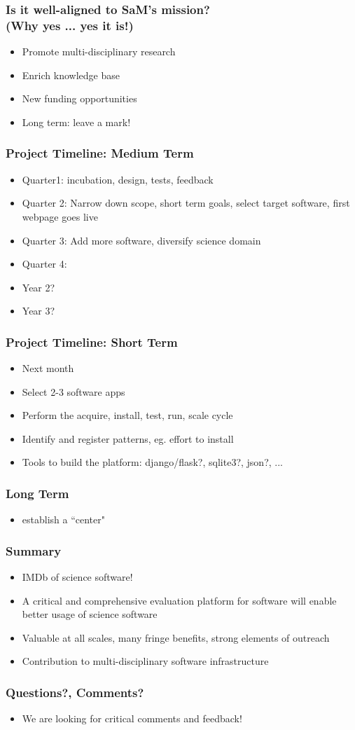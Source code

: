 \documentclass[hyperref={pdfpagelabels=false},12pt]{beamer}
\begin{document}
\begin{frame}
\frametitle{Is it well-aligned to SaM's mission? \\ (Why yes ... yes it is!)}
\begin{itemize}
\itemsep1em
\item 
Promote multi-disciplinary research
\item
Enrich knowledge base
\item
New funding opportunities
\item
Long term: leave a mark!
\end{itemize}
\end{frame}

\begin{frame}
\frametitle{Project Timeline: Medium Term}
\begin{itemize}
\itemsep1em
\item 
Quarter1: incubation, design, tests, feedback
\item
Quarter 2: Narrow down scope, short term goals, select target software, first webpage goes live
\item
Quarter 3: Add more software, diversify science domain
\item
Quarter 4:
\item
Year 2?
\item
Year 3?
\end{itemize}
\end{frame}

\begin{frame}
\frametitle{Project Timeline: Short Term}
\begin{itemize}
\itemsep1em
\item 
Next month
\item
Select 2-3 software apps
\item
Perform the acquire, install, test, run, scale cycle
\item
Identify and register patterns, eg. effort to install
\item
Tools to build the platform: django/flask?, sqlite3?, json?, ...
\end{itemize}
\end{frame}

\begin{frame}
\frametitle{Long Term}
\begin{itemize}
\item 
establish a ``center"
\end{itemize}
\end{frame}

\begin{frame}
\frametitle{Summary}
\begin{itemize}
\itemsep1em
\item IMDb of science software!
\item
A critical and comprehensive evaluation platform for software will enable better usage of science software
\item
Valuable at all scales, many fringe benefits, strong elements of outreach
\item
Contribution to multi-disciplinary software infrastructure
\end{itemize}
\end{frame}

\begin{frame}
\frametitle{Questions?, Comments?}
\begin{itemize}
\item We are looking for critical comments and feedback!
\end{itemize}
\end{frame}
\end{document}
